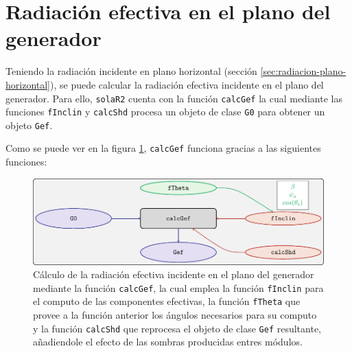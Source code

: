\section{Radiación efectiva en el plano del generador}
\label{sec:org47040ff}
\label{sec:radiacion-efectiva-plano-generador}
Teniendo la radiación incidente en plano horizontal (sección \ref{sec:radiacion-plano-horizontal}), se puede calcular la radiación efectiva incidente en el plano del generador. Para ello, \texttt{solaR2} cuenta con la función \texttt{calcGef} la cual mediante las funciones \texttt{fInclin} y \texttt{calcShd} procesa un objeto de clase \texttt{G0} para obtener un objeto \texttt{Gef}.

Como se puede ver en la figura \ref{fig:calcgef}, \texttt{calcGef} funciona gracias a las siguientes funciones:
\begin{figure}[htbp]
\centering
\includegraphics[keepaspectratio,width=\textwidth,height=0.5\textheight]{figuras/calcgef.pdf}
\caption{Cálculo de la radiación efectiva incidente en el plano del generador mediante la función \texttt{calcGef}, la cual emplea la función \texttt{fInclin} para el computo de las componentes efectivas, la función \texttt{fTheta} que provee a la función anterior los ángulos necesarios para su computo y la función \texttt{calcShd} que reprocesa el objeto de clase \texttt{Gef} resultante, añadiendole el efecto de las sombras producidas entres módulos. \label{fig:calcgef}}
\end{figure}
